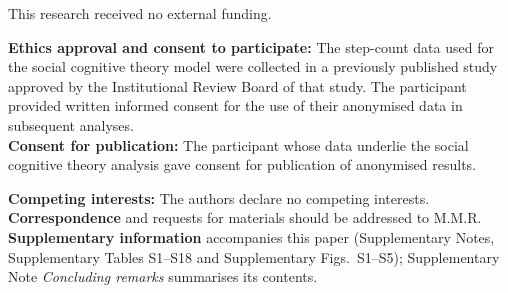 \documentclass[pdflatex,sn-nature]{sn-jnl}
\theoremstyle{plain}
\begin{document}
This research received no external funding.

\textbf{Ethics approval and consent to participate:} The step-count data used for the social cognitive theory model were collected in a previously published study\cite{bib35} approved by the Institutional Review Board of that study. The participant provided written informed consent for the use of their anonymised data in subsequent analyses.\\
\textbf{Consent for publication:} The participant whose data underlie the social cognitive theory analysis gave consent for publication of anonymised results.

\textbf{Competing interests:} The authors declare no competing interests.\\
\textbf{Correspondence} and requests for materials should be addressed to M.M.R.\\
\textbf{Supplementary information} accompanies this paper (Supplementary Notes, Supplementary Tables S1--S18 and Supplementary Figs.~S1--S5); Supplementary Note \textit{Concluding remarks} summarises its contents.


\end{document}
